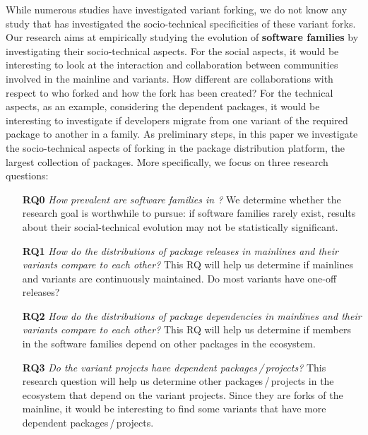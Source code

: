 While numerous studies have investigated variant forking, we do not know any study that has investigated the socio-technical specificities of these variant forks.
Our research aims at empirically studying the evolution of \textbf{software families} by investigating their socio-technical aspects.
For the social aspects, it would be interesting to look at the interaction and collaboration between communities involved in the mainline and variants.
How different are collaborations with respect to who forked and how the fork has been created?
For the technical aspects, as an example, considering the dependent packages, it would be interesting to investigate if developers migrate from one variant of the required package to another in a family.
As preliminary steps, in this paper we investigate the socio-technical aspects of forking in the \np package distribution platform, the largest collection of \js packages. More specifically, we focus on three research questions:
\begin{itemize}
\item[\textbf{RQ0}] \textit{How prevalent are software families in \np?}
We determine whether the research goal is worthwhile to pursue: if software families rarely exist, results about their social-technical evolution may not be statistically significant.

\item[\textbf{RQ1}] \textit{How do the distributions of package releases in mainlines and their variants compare to each other? }
This RQ will help us determine if mainlines and variants are continuously maintained.
Do most variants have one-off releases?

\item[\textbf{RQ2}] \textit{How do the distributions of package dependencies in mainlines and their variants compare to each other?}
This RQ will help us determine if members in the software families depend on other packages in the \np ecosystem.

\item[\textbf{RQ3}] \textit{Do the variant projects have dependent packages\,/\,projects?}
This research question will help us determine other packages\,/\,projects in the ecosystem that depend on the variant projects.
Since they are forks of the mainline, it would be interesting to find some variants that have more dependent packages\,/\,projects.
\end{itemize}

